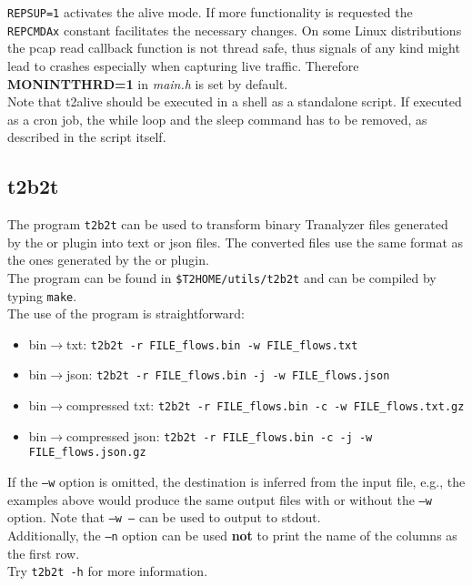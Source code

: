 \documentclass[documentation]{subfiles}
\begin{document}
{\tt REPSUP=1} activates the alive mode.
If more functionality is requested the {\tt REPCMDAx} constant facilitates the necessary changes.
On some Linux distributions the pcap read callback function is not thread safe, thus signals of any kind might lead to crashes especially when capturing live traffic.
Therefore {\bf MONINTTHRD=1} in {\em main.h} is set by default. \\
Note that t2alive should be executed in a shell as a standalone script.
If executed as a cron job, the while loop and the sleep command has to be removed, as described in the script itself.

\subsection{t2b2t}\label{t2b2t}
The program {\tt t2b2t} can be used to transform binary Tranalyzer files generated by the  or  plugin into text or json files.
The converted files use the same format as the ones generated by the  or  plugin.\\

The program can be found in {\tt\$T2HOME/utils/t2b2t} and can be compiled by typing {\tt make}.\\

The use of the program is straightforward:
\begin{itemize}
    \item bin$\rightarrow$txt: {\tt t2b2t -r FILE\_flows.bin -w FILE\_flows.txt}
    \item bin$\rightarrow$json: {\tt t2b2t -r FILE\_flows.bin -j -w FILE\_flows.json}
    \item bin$\rightarrow$compressed txt: {\tt t2b2t -r FILE\_flows.bin -c -w FILE\_flows.txt.gz}
    \item bin$\rightarrow$compressed json: {\tt t2b2t -r FILE\_flows.bin -c -j -w FILE\_flows.json.gz}
\end{itemize}

If the {\tt --w} option is omitted, the destination is inferred from the input file, e.g., the examples above would produce the same output files with or without the {\tt --w} option. Note that {\tt --w --} can be used to output to stdout.\\
Additionally, the {\tt --n} option can be used {\bf not} to print the name of the columns as the first row.\\
Try {\tt t2b2t -h} for more information.
\end{document}
